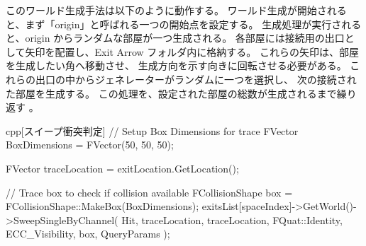 \documentclass{../../Styles/AI-Research-STY}
\begin{document}
\begin{Form}
{        このワールド生成手法は以下のように動作する。
        ワールド生成が開始されると、まず「origin」と呼ばれる一つの開始点を設定する。
        生成処理が実行されると、origin からランダムな部屋が一つ生成される。
        各部屋には接続用の出口として矢印を配置し、Exit Arrow フォルダ内に格納する。
        これらの矢印は、部屋を生成したい角へ移動させ、
        生成方向を示す向きに回転させる必要がある。
        これらの出口の中からジェネレーターがランダムに一つを選択し、
        次の接続された部屋を生成する。
        この処理を、設定された部屋の総数が生成されるまで繰り返す \parencite{HowToCreateEpicProceduralDungeons}。

	}

    \begin{codeBlock}{cpp}[スイープ衝突判定]
// Setup Box Dimensions for trace
FVector BoxDimensions = FVector(50, 50, 50);

FVector traceLocation = exitLocation.GetLocation();

// Trace box to check if collision available
FCollisionShape box = FCollisionShape::MakeBox(BoxDimensions);
exitsList[spaceIndex]->GetWorld()->SweepSingleByChannel(
    Hit,
    traceLocation,
    traceLocation,
    FQuat::Identity,
    ECC_Visibility,
    box,
    QueryParams
);


\end{codeBlock}
\end{Form}
\end{document}
